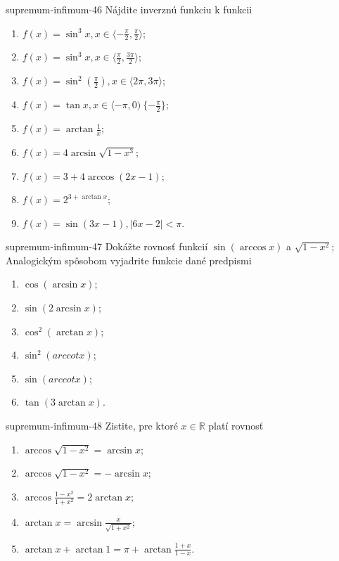 \begin{defproblem}{supremum-infimum-46}
Nájdite inverznú funkciu k funkcii
\begin{multicols}{2}
\begin{enumerate}
    \item $f(x)=\sin^3 x,x\in\langle-\frac{\pi}{2},\frac{\pi}{2}\rangle$;
    \item $f(x)=\sin^3 x,x\in\langle\frac{\pi}{2},\frac{3\pi}{2}\rangle$;
    \item $f(x)=\sin^2 (\frac{\pi}{2}),x\in\langle 2\pi,3\pi \rangle$;
    \item $f(x)=\tan x,x\in\langle -\pi,0)\ \{-\frac{\pi}{2}\}$;
    \item $f(x)=\arctan\frac{1}{x}$;
    \item $f(x)=4\arcsin\sqrt{1-x^3}$;
    \item $f(x)=3+4\arccos(2x-1)$;
    \item $f(x)=2^{3+\arctan x}$;
    \item $f(x)=\sin (3x-1),|6x-2|<\pi$.
\end{enumerate}
\end{multicols}
\end{defproblem}

\begin{defproblem}{supremum-infimum-47}
Dokážte rovnosť funkcií $\sin(\arccos x)$ a $\sqrt{1-x^2}$; Analogickým spôsobom vyjadrite funkcie dané predpismi
\begin{multicols}{2}
\begin{enumerate}
    \item $\cos(\arcsin x)$;
    \item $\sin(2\arcsin x)$;
    \item $\cos^2 (\arctan x)$;
    \item $\sin^2 (arccot x)$;
    \item $\sin (arccot x)$;
    \item $\tan (3\arctan x)$.
\end{enumerate}
\end{multicols}
\end{defproblem}

\begin{defproblem}{supremum-infimum-48}
Zistite, pre ktoré $x\in\mathbb{R}$ platí rovnosť
\begin{multicols}{2}
\begin{enumerate}
    \item $\arccos\sqrt{1-x^2}=\arcsin x$;
    \item $\arccos\sqrt{1-x^2}=-\arcsin x$;
    \item $\arccos\frac{1-x^2}{1+x^2}=2\arctan x$;
    \item $\arctan x=\arcsin\frac{x}{\sqrt{1+x^2}}$;
    \item $\arctan x +\arctan 1 =\pi+ \arctan\frac{1+x}{1-x}$.
\end{enumerate}
\end{multicols}
\end{defproblem}

